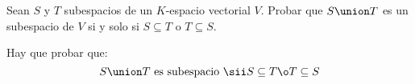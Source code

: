 \begin{enunciado}{\ejercicio}
  Sean $S$ y $T$ subespacios de un $K$-espacio vectorial $V$. Probar que $S\union T$ es un subespacio
  de $V$ si y solo si $S \subseteq T$ o $T \subseteq S$.
\end{enunciado}

Hay que probar que:
$$
  S \union T \text{ es subespacio }
  \sii
  S \subseteq T \o T \subseteq S
$$

